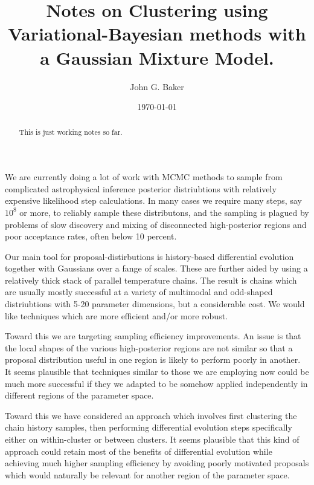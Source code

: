 \documentclass[aps,showpacs,twocolumn,prd,superscriptaddress,nofootinbib]{revtex4}
\begin{document}
\title{Notes on Clustering using Variational-Bayesian methods with a Gaussian Mixture Model.}

\author{John G. Baker}

\date{\today}

\begin{abstract}

This is just working notes so far.

\end{abstract}

\maketitle

We are currently doing a lot of work with MCMC methods to sample from complicated astrophysical inference posterior distriubtions with relatively expensive likelihood step calculations.  In many cases we require many steps, say $10^8$ or more, to reliably sample these distributons, and the sampling is plagued by problems of slow discovery and mixing of disconnected high-posterior regions and poor acceptance rates, often below 10 percent.

Our main tool for proposal-distirbutions is history-based differential evolution together with Gaussians over a fange of scales.  These are further aided by using a relatively thick stack of parallel temperature chains. The result is chains which are usually mostly successful at a variety of multimodal and odd-shaped distriubtions with 5-20 parameter dimensions, but a considerable cost. We would like techniques which are more efficient and/or more robust.

Toward this we are targeting sampling efficiency improvements.  An issue is that the local shapes of the various high-posterior regions are not similar so that a proposal distribution useful in one region is likely to perform poorly in another.  It seems plausible that techniques similar to those we are employing now could be much more successful if they we adapted to be somehow applied independently in different regions of the parameter space.

Toward this we have considered an approach which involves first clustering the chain history samples, then performing differential evolution steps specifically either on within-cluster or between clusters.  It seems plausible that this kind of approach could retain most of the benefits of differential evolution while achieving much higher sampling efficiency by avoiding poorly motivated proposals which would naturally be relevant for another region of the parameter space.
\end{document}
